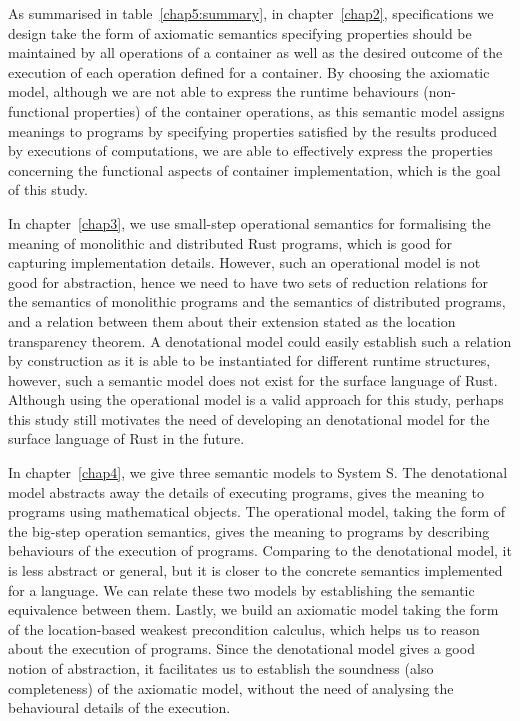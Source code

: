 \begin{highlightnew}
As summarised in table~\ref{chap5:summary}, in chapter~\ref{chap2}, specifications we design take the form of axiomatic semantics specifying properties should be maintained by all operations of a container as well as the desired outcome of the execution of each operation defined for a container. By choosing the axiomatic model, although we are not able to express the runtime behaviours (non-functional properties) of the container operations, as this semantic model assigns meanings to programs by specifying properties satisfied by the results produced by executions of computations, we are able to effectively express the properties concerning the functional aspects of container implementation, which is the goal of this study. 

In chapter~\ref{chap3}, we use small-step operational semantics for formalising the meaning of monolithic and distributed Rust programs, which is good for capturing implementation details. However, such an operational model is not good for abstraction, hence we need to have two sets of reduction relations for the semantics of monolithic programs and the semantics of distributed programs, and a relation between them about their extension stated as the location transparency theorem. A denotational model could easily establish such a relation by construction as it is able to be instantiated for different runtime structures, however, such a semantic model does not exist for the surface language of Rust. Although using the operational model is a valid approach for this study, perhaps this study still motivates the need of developing an denotational model for the surface language of Rust in the future.

In chapter~\ref{chap4}, we give three semantic models to System S. The denotational model abstracts away the details of executing programs, gives the meaning to programs using mathematical objects. The operational model, taking the form of the big-step operation semantics, gives the meaning to programs by describing behaviours of the execution of programs. Comparing to the denotational model, it is less abstract or general, but it is closer to the concrete semantics implemented for a language. We can relate these two models by establishing the semantic equivalence between them. Lastly, we build an axiomatic model taking the form of the location-based weakest precondition calculus, which helps us to reason about the execution of programs.
Since the denotational model gives a good notion of abstraction, it facilitates us to establish the soundness (also completeness) of the axiomatic model, without the need of analysing the behavioural details of the execution.


\end{highlightnew}
